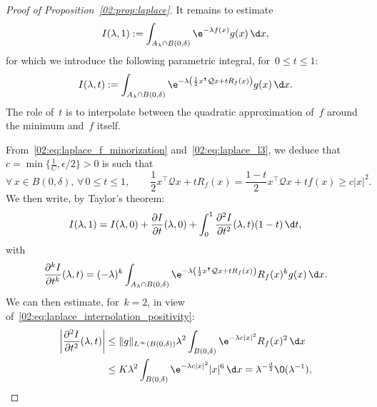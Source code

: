 \begin{proof}[Proof of Proposition~\ref{02:prop:laplace}]
            It remains to estimate
            \begin{equation}
                I(\lambda,1) := \int_{A_\lambda \cap B(0,\delta)} \e^{-\lambda f(x)}g(x)\,\d x,
            \end{equation}
            for which we introduce the following parametric integral, for~$0\leq t\leq 1$:
            \begin{equation}
                I(\lambda,t) := \int_{A_\lambda \cap B(0,\delta)} \e^{-\lambda\left(\frac12 x^\intercal \mathcal Q x + t R_f(x)\right)}g(x)\,\d x.
            \end{equation}
            The role of~$t$ is to interpolate between the quadratic approximation of~$f$ around the minimum and~$f$ itself.

            From~\eqref{02:eq:laplace_f_minorization} and~\eqref{02:eq:laplace_l3}, we deduce that~$c = \min\{\frac1C,\epsilon/2\}>0$ is such that
            \begin{equation}
                \label{02:eq:laplace_interpolation_positivity}
                \forall\, x\in B(0,\delta),\,\forall\,0\leq t\leq 1,\qquad\frac 12x^\intercal \mathcal Q x + t R_f(x) = \frac{1-t}2x^\intercal \mathcal Q x + tf(x) \geq c|x|^2.
            \end{equation}
            We then write, by Taylor's theorem:
            \begin{equation}
                I(\lambda,1) = I(\lambda,0) + \frac{\partial I}{\partial t}(\lambda,0)  + \int_0^1 \frac{\partial^2 I}{\partial t^2}(\lambda,t)(1-t)\,\d t,
            \end{equation}
            with
            \begin{equation}
                \frac{\partial^k I}{\partial t^k}(\lambda, t) = (-\lambda)^k\int_{A_\lambda \cap B(0,\delta)} \e^{-\lambda\left(\frac12x^\intercal \mathcal Q x +tR_f(x)\right)}R_f(x)^k g(x)\,\d x.
            \end{equation}
            We can then estimate, for~$k=2$, in view of~\eqref{02:eq:laplace_interpolation_positivity}:
            \begin{equation}
                \label{02:eq:laplace_error_a}
                \begin{aligned}
                    \left|\frac{\partial^2 I}{\partial t^2}(\lambda, t)\right| &\leq \|g\|_{L^\infty(B(0,\delta))} \lambda^2\int_{B(0,\delta)}\e^{-\lambda c|x|^2}R_f(x)^2\,\d x\\
                    &\leq K\lambda^2\int_{B(0,\delta)}\e^{- \lambda c|x|^2}|x|^6\,\d x = \lambda^{-\frac d2}\O(\lambda^{-1}),

\end{aligned}
\end{equation}
\end{proof}
